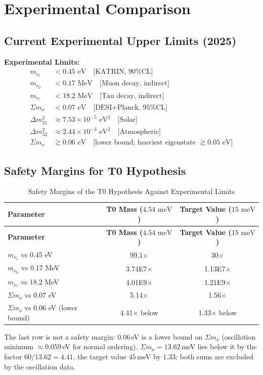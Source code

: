 	\section{Experimental Comparison}
	
	\subsection{Current Experimental Upper Limits (2025)}
	
	\begin{experimental}
		\textbf{Experimental Limits:}
		\begin{align}
			m_{\nu_e} &< 0.45 \text{ eV} \quad \text{[KATRIN, 90\% CL]} \\
			m_{\nu_\mu} &< 0.17 \text{ MeV} \quad \text{[Muon decay, indirect]} \\
			m_{\nu_\tau} &< 18.2 \text{ MeV} \quad \text{[Tau decay, indirect]} \\
			\Sigma m_\nu &< 0.07 \text{ eV} \quad \text{[DESI+Planck, 95\% CL]} \\
			\Delta m^2_{21} &\approx 7.53 \times 10^{-5} \text{ eV}^2 \quad \text{[Solar]} \\
			\Delta m^2_{32} &\approx 2.44 \times 10^{-3} \text{ eV}^2 \quad \text{[Atmospheric]} \\
			\Sigma m_\nu &\gtrsim 0.06 \text{ eV} \quad \text{[lower bound; heaviest eigenstate } \gtrsim 0.05\text{ eV]}
		\end{align}
	\end{experimental}
	
	\subsection{Safety Margins for T0 Hypothesis}
	
	\begin{longtable}[c]{@{}lcc@{}}
		\caption{Safety Margins of the T0 Hypothesis Against Experimental Limits} \\
		\toprule
		\textbf{Parameter} & \textbf{T0 Mass (\(4.54 \text{ meV}\))} & \textbf{Target Value (\(15 \text{ meV}\))} \\
		\midrule
		\endfirsthead
		\toprule
		\textbf{Parameter} & \textbf{T0 Mass (\(4.54 \text{ meV}\))} & \textbf{Target Value (\(15 \text{ meV}\))} \\
		\midrule
		\endhead
		$m_{\nu_e}$ vs 0.45 eV & 99.1× & 30× \\
		$m_{\nu_\mu}$ vs 0.17 MeV & 3.74E7× & 1.13E7× \\
		$m_{\nu_\tau}$ vs 18.2 MeV & 4.01E9× & 1.21E9× \\
		\midrule
		$\Sigma m_\nu$ vs 0.07 eV & 5.14× & 1.56× \\
		$\Sigma m_\nu$ vs 0.06 eV (lower bound) & 4.41× below & 1.33× below \\
		\bottomrule
	\end{longtable}
	The last row is not a safety margin: $0.06$\,eV is a lower bound on $\Sigma m_\nu$ (oscillation minimum $\approx0.059$\,eV for normal ordering). $\Sigma m_\nu=13.62$\,meV lies below it by the factor $60/13.62=4.41$, the target value $45$\,meV by $1.33$; both sums are excluded by the oscillation data.
\normalsize
	
